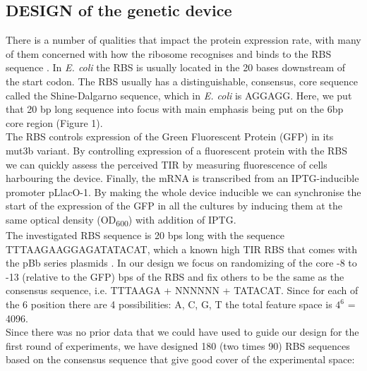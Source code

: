 \documentclass{article}
\begin{document}
\subsection{DESIGN of the genetic device}
There is a number of qualities that impact the protein expression rate, with many of them concerned with how the ribosome recognises and binds to the RBS sequence \cite{Chen1994,Vellanoweth1992}. In \emph{E. coli} the RBS is usually located in the 20 bases downstream of the start codon. The RBS usually has a distinguishable, consensus, core sequence called the Shine-Dalgarno sequence, which in \emph{E. coli} is AGGAGG. Here, we put that 20 bp long sequence into focus with main emphasis being put on the 6bp core region (Figure 1).\\
The RBS controls expression of the Green Fluorescent Protein (GFP) in its mut3b variant. By controlling expression of a fluorescent protein with the RBS we can quickly assess the perceived TIR by measuring fluorescence of cells harbouring the device. Finally, the mRNA is transcribed from an IPTG-inducible promoter pLlacO-1. By making the whole device inducible we can synchronise the start of the expression of the GFP in all the cultures by inducing them at the same optical density (OD\textsubscript{600}) with addition of IPTG.\\
The investigated RBS sequence is 20 bps long with the sequence TTTAAGAAGGAGATATACAT, which a known high TIR RBS that comes with the pBb series plasmids \cite{Lee2011}. In our design we focus on randomizing of the core -8 to -13 (relative to the GFP) bps of the RBS and fix others to be the same as the consensus sequence, i.e. TTTAAGA + NNNNNN + TATACAT. Since for each of the 6 position there are 4 possibilities: A, C, G, T the total feature space is $4^6$ = 4096.\\
Since there was no prior data that we could have used to guide our design for the first round of experiments, we have designed 180 (two times 90) RBS sequences based on the consensus sequence that give good cover of the experimental space: 
\end{document}

